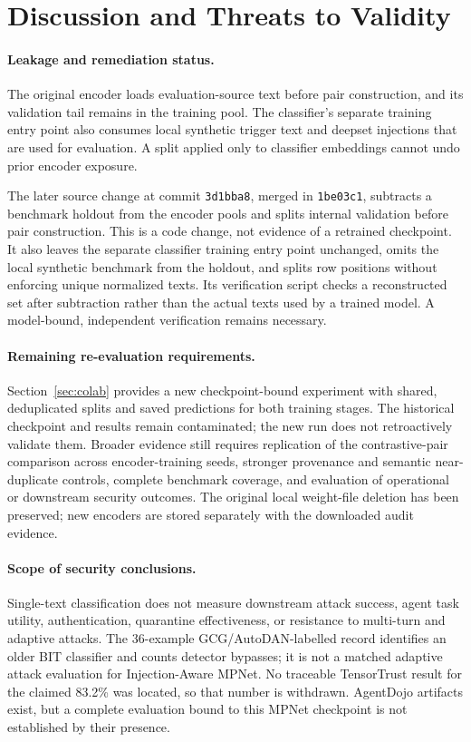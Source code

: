 \documentclass[11pt, a4paper]{article}
\begin{document}
\section{Discussion and Threats to Validity}
\label{sec:limitations}

\paragraph{Leakage and remediation status.}
The original encoder loads evaluation-source text before pair construction,
and its validation tail remains in the training pool. The classifier's
separate training entry point also consumes local synthetic trigger text
and deepset injections that are used for evaluation. A split applied only
to classifier embeddings cannot undo prior encoder exposure.

The later source change at commit \texttt{3d1bba8}, merged in
\texttt{1be03c1}, subtracts a benchmark holdout from the encoder pools and
splits internal validation before pair construction. This is a code change,
not evidence of a retrained checkpoint. It also leaves the separate
classifier training entry point unchanged, omits the local synthetic
benchmark from the holdout, and splits row positions without enforcing
unique normalized texts. Its verification script checks a reconstructed
set after subtraction rather than the actual texts used by a trained model.
A model-bound, independent verification remains necessary.

\paragraph{Remaining re-evaluation requirements.}
Section~\ref{sec:colab} provides a new checkpoint-bound experiment with
shared, deduplicated splits and saved predictions for both training stages.
The historical checkpoint and results remain contaminated; the new run does
not retroactively validate them. Broader evidence still requires replication
of the contrastive-pair comparison across encoder-training seeds, stronger
provenance and semantic near-duplicate controls, complete
benchmark coverage, and evaluation of operational or downstream security
outcomes. The original local weight-file deletion has been preserved;
new encoders are stored separately with the downloaded audit evidence.

\paragraph{Scope of security conclusions.}
Single-text classification does not measure downstream attack success,
agent task utility, authentication, quarantine effectiveness, or resistance
to multi-turn and adaptive attacks. The 36-example GCG/AutoDAN-labelled
record identifies an older BIT classifier and counts detector bypasses;
it is not a matched adaptive attack evaluation for Injection-Aware MPNet.
No traceable TensorTrust result for the claimed 83.2\% was located, so that
number is withdrawn. AgentDojo artifacts exist, but a complete evaluation
bound to this MPNet checkpoint is not established by their presence.
\end{document}
